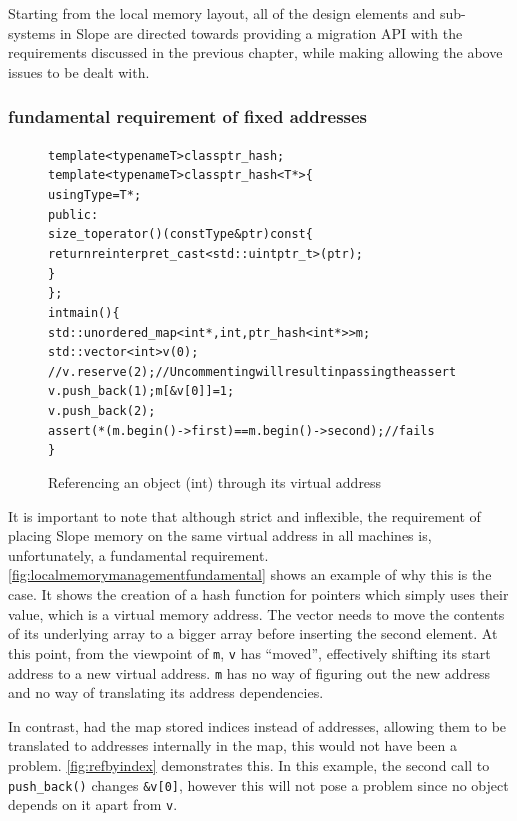 Starting from the local memory layout, all of the design elements and
sub-systems in Slope are directed towards providing a migration API with the
requirements discussed in the previous chapter, while making allowing the above
issues to be dealt with.


\subsubsection{fundamental requirement of fixed addresses}
\label{sec:fixedfundamental}
\begin{figure}[tp]
\begin{alltt}

template<typename T> class ptr_hash;
template<typename T> class ptr_hash<T*> \{
  using Type = T*;
 public:
  size_t operator()(const Type& ptr) const \{
    return reinterpret_cast<std::uintptr_t>(ptr);
  \}
\};
int main() \{
  std::unordered_map<int*, int, ptr_hash<int*>> m;
  std::vector<int> v(0);
  // v.reserve(2); // Uncommenting will result in passing the assert
  v.push_back(1); m[&v[0]] = 1;
  v.push_back(2);
  assert(*(m.begin()->first) == m.begin()->second); // fails
\}

\end{alltt}
\caption{
    Referencing an object (int) through its virtual address
}
\label{fig:localmemorymanagementfundamental}
\end{figure}
It is important to note that although strict and inflexible, the requirement of
placing Slope memory on the same virtual address in all machines is,
unfortunately, a fundamental requirement. \autoref{fig:localmemorymanagementfundamental}
shows an example of why this is the case. It shows the creation of a hash
    function for pointers which simply uses their value, which is a virtual
    memory address. The vector needs to move the contents of its underlying
    array to a bigger array before inserting the second element. At this point, from the viewpoint of
    \texttt{m}, \texttt{v} has ``moved'', effectively shifting its start
    address to a new virtual address. \texttt{m} has no way of figuring out
    the new address and no way of translating its address dependencies.

In contrast, had the map stored indices instead of addresses, allowing them
to be translated to addresses internally in the map, this would not have been
a problem. \autoref{fig:refbyindex} demonstrates this. In this example,
the second call to \texttt{push\_back()} changes \texttt{\&v[0]}, however this
will not pose a problem since no object depends on it apart from \texttt{v}.

